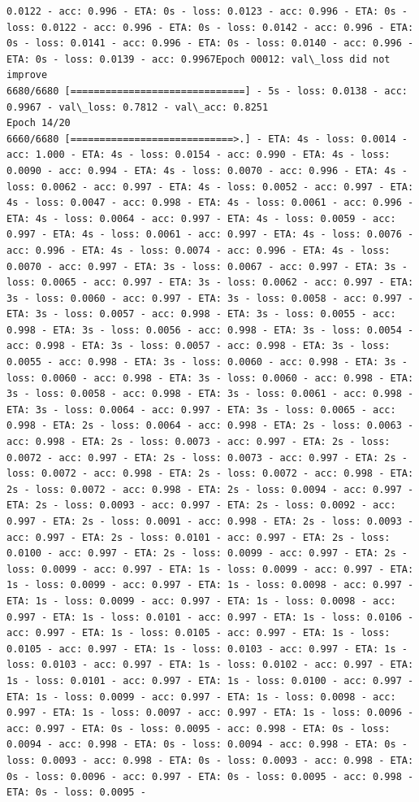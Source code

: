 \documentclass[11pt]{article}
\begin{document}
\begin{Verbatim}[commandchars=\\\{\}]
0.0122 - acc: 0.996 - ETA: 0s - loss: 0.0123 - acc: 0.996 - ETA: 0s - loss: 0.0122 - acc: 0.996 - ETA: 0s - loss: 0.0142 - acc: 0.996 - ETA: 0s - loss: 0.0141 - acc: 0.996 - ETA: 0s - loss: 0.0140 - acc: 0.996 - ETA: 0s - loss: 0.0139 - acc: 0.9967Epoch 00012: val\_loss did not improve
6680/6680 [==============================] - 5s - loss: 0.0138 - acc: 0.9967 - val\_loss: 0.7812 - val\_acc: 0.8251
Epoch 14/20
6660/6680 [============================>.] - ETA: 4s - loss: 0.0014 - acc: 1.000 - ETA: 4s - loss: 0.0154 - acc: 0.990 - ETA: 4s - loss: 0.0090 - acc: 0.994 - ETA: 4s - loss: 0.0070 - acc: 0.996 - ETA: 4s - loss: 0.0062 - acc: 0.997 - ETA: 4s - loss: 0.0052 - acc: 0.997 - ETA: 4s - loss: 0.0047 - acc: 0.998 - ETA: 4s - loss: 0.0061 - acc: 0.996 - ETA: 4s - loss: 0.0064 - acc: 0.997 - ETA: 4s - loss: 0.0059 - acc: 0.997 - ETA: 4s - loss: 0.0061 - acc: 0.997 - ETA: 4s - loss: 0.0076 - acc: 0.996 - ETA: 4s - loss: 0.0074 - acc: 0.996 - ETA: 4s - loss: 0.0070 - acc: 0.997 - ETA: 3s - loss: 0.0067 - acc: 0.997 - ETA: 3s - loss: 0.0065 - acc: 0.997 - ETA: 3s - loss: 0.0062 - acc: 0.997 - ETA: 3s - loss: 0.0060 - acc: 0.997 - ETA: 3s - loss: 0.0058 - acc: 0.997 - ETA: 3s - loss: 0.0057 - acc: 0.998 - ETA: 3s - loss: 0.0055 - acc: 0.998 - ETA: 3s - loss: 0.0056 - acc: 0.998 - ETA: 3s - loss: 0.0054 - acc: 0.998 - ETA: 3s - loss: 0.0057 - acc: 0.998 - ETA: 3s - loss: 0.0055 - acc: 0.998 - ETA: 3s - loss: 0.0060 - acc: 0.998 - ETA: 3s - loss: 0.0060 - acc: 0.998 - ETA: 3s - loss: 0.0060 - acc: 0.998 - ETA: 3s - loss: 0.0058 - acc: 0.998 - ETA: 3s - loss: 0.0061 - acc: 0.998 - ETA: 3s - loss: 0.0064 - acc: 0.997 - ETA: 3s - loss: 0.0065 - acc: 0.998 - ETA: 2s - loss: 0.0064 - acc: 0.998 - ETA: 2s - loss: 0.0063 - acc: 0.998 - ETA: 2s - loss: 0.0073 - acc: 0.997 - ETA: 2s - loss: 0.0072 - acc: 0.997 - ETA: 2s - loss: 0.0073 - acc: 0.997 - ETA: 2s - loss: 0.0072 - acc: 0.998 - ETA: 2s - loss: 0.0072 - acc: 0.998 - ETA: 2s - loss: 0.0072 - acc: 0.998 - ETA: 2s - loss: 0.0094 - acc: 0.997 - ETA: 2s - loss: 0.0093 - acc: 0.997 - ETA: 2s - loss: 0.0092 - acc: 0.997 - ETA: 2s - loss: 0.0091 - acc: 0.998 - ETA: 2s - loss: 0.0093 - acc: 0.997 - ETA: 2s - loss: 0.0101 - acc: 0.997 - ETA: 2s - loss: 0.0100 - acc: 0.997 - ETA: 2s - loss: 0.0099 - acc: 0.997 - ETA: 2s - loss: 0.0099 - acc: 0.997 - ETA: 1s - loss: 0.0099 - acc: 0.997 - ETA: 1s - loss: 0.0099 - acc: 0.997 - ETA: 1s - loss: 0.0098 - acc: 0.997 - ETA: 1s - loss: 0.0099 - acc: 0.997 - ETA: 1s - loss: 0.0098 - acc: 0.997 - ETA: 1s - loss: 0.0101 - acc: 0.997 - ETA: 1s - loss: 0.0106 - acc: 0.997 - ETA: 1s - loss: 0.0105 - acc: 0.997 - ETA: 1s - loss: 0.0105 - acc: 0.997 - ETA: 1s - loss: 0.0103 - acc: 0.997 - ETA: 1s - loss: 0.0103 - acc: 0.997 - ETA: 1s - loss: 0.0102 - acc: 0.997 - ETA: 1s - loss: 0.0101 - acc: 0.997 - ETA: 1s - loss: 0.0100 - acc: 0.997 - ETA: 1s - loss: 0.0099 - acc: 0.997 - ETA: 1s - loss: 0.0098 - acc: 0.997 - ETA: 1s - loss: 0.0097 - acc: 0.997 - ETA: 1s - loss: 0.0096 - acc: 0.997 - ETA: 0s - loss: 0.0095 - acc: 0.998 - ETA: 0s - loss: 0.0094 - acc: 0.998 - ETA: 0s - loss: 0.0094 - acc: 0.998 - ETA: 0s - loss: 0.0093 - acc: 0.998 - ETA: 0s - loss: 0.0093 - acc: 0.998 - ETA: 0s - loss: 0.0096 - acc: 0.997 - ETA: 0s - loss: 0.0095 - acc: 0.998 - ETA: 0s - loss: 0.0095 - 
\end{Verbatim}
\end{document}
